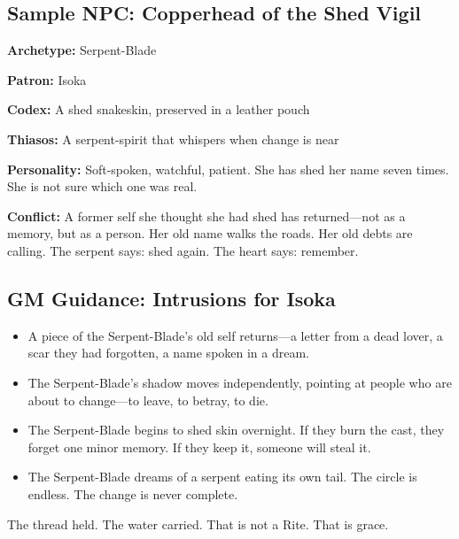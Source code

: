\subsection{Sample NPC: Copperhead of the Shed Vigil}

\textbf{Archetype:} Serpent-Blade

\textbf{Patron:} Isoka

\textbf{Codex:} A shed snakeskin, preserved in a leather pouch

\textbf{Thiasos:} A serpent-spirit that whispers when change is near

\textbf{Personality:} Soft-spoken, watchful, patient. She has shed her name seven times. She is not sure which one was real.

\textbf{Conflict:} A former self she thought she had shed has returned—not as a memory, but as a person. Her old name walks the roads. Her old debts are calling. The serpent says: shed again. The heart says: remember.

\subsection{GM Guidance: Intrusions for Isoka}

\begin{itemize}
\item A piece of the Serpent-Blade's old self returns—a letter from a dead lover, a scar they had forgotten, a name spoken in a dream.
\item The Serpent-Blade's shadow moves independently, pointing at people who are about to change—to leave, to betray, to die.
\item The Serpent-Blade begins to shed skin overnight. If they burn the cast, they forget one minor memory. If they keep it, someone will steal it.
\item The Serpent-Blade dreams of a serpent eating its own tail. The circle is endless. The change is never complete.
\end{itemize}

The thread held. The water carried. That is not a Rite. That is grace.
